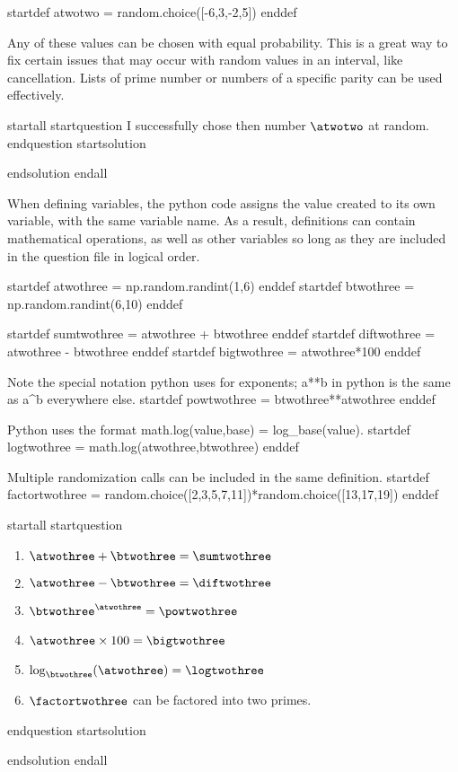 startdef atwotwo = random.choice([-6,3,-2,5]) enddef

Any of these values can be chosen with equal probability. This is a great way to fix certain issues that may occur with random values in an interval, like cancellation. Lists of prime number or numbers of a specific parity can be used effectively.

startall
startquestion I successfully chose then number $\atwotwo$ at random. endquestion
startsolution \item  endsolution
endall




When defining variables, the python code assigns the value created to its own variable, with the same variable name. As a result, definitions can contain mathematical operations, as well as other variables so long as they are included in the question file in logical order.

startdef atwothree = np.random.randint(1,6) enddef
startdef btwothree = np.random.randint(6,10) enddef

startdef sumtwothree = atwothree + btwothree enddef
startdef diftwothree = atwothree - btwothree enddef
startdef bigtwothree = atwothree*100 enddef

Note the special notation python uses for exponents; a**b in python is the same as a^b everywhere else.
startdef powtwothree = btwothree**atwothree enddef 

Python uses the format math.log(value,base) = log_base(value).
startdef logtwothree = math.log(atwothree,btwothree) enddef

Multiple randomization calls can be included in the same definition.
startdef factortwothree = random.choice([2,3,5,7,11])*random.choice([13,17,19]) enddef

startall
startquestion \begin{enumerate}
\item $\atwothree + \btwothree = \sumtwothree$
\item $\atwothree - \btwothree = \diftwothree$
\item $\btwothree^{\atwothree} = \powtwothree$
\item $\atwothree \times 100 = \bigtwothree$
\item $\log_{\btwothree}(\atwothree) = \logtwothree$
\item $\factortwothree$ can be factored into two primes.
\end{enumerate} endquestion
startsolution \item  endsolution
endall

